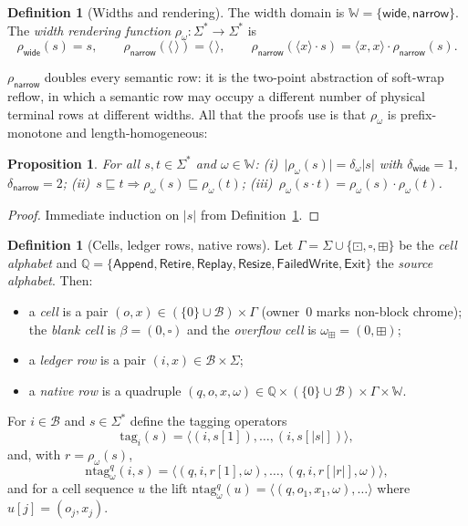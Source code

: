 \documentclass[11pt]{article}
\newcommand{\seq}[1]{\langle #1\rangle}
\newcommand{\emptyseq}{\seq{\,}}
\newcommand{\len}[1]{\lvert #1\rvert}
\newcommand{\pre}{\sqsubseteq}                 %
\newcommand{\cat}{\mathbin{\cdot}}             %
\newcommand{\Blocks}{\mathcal{B}}
\newcommand{\Wd}{\mathbb{W}}
\newcommand{\Src}{\mathbb{Q}}
\newcommand{\PhRow}{\boxdot}                   %
\newcommand{\BlRow}{\square}                   %
\newcommand{\OvRow}{\boxplus}                  %
\newcommand{\Bcell}{\beta}                     %
\newcommand{\Ocell}{\omega_{\OvRow}}
\newcommand{\wide}{\mathsf{wide}}
\newcommand{\narrow}{\mathsf{narrow}}
\newcommand{\srcApp}{\mathsf{Append}}
\newcommand{\srcRet}{\mathsf{Retire}}
\newcommand{\srcRep}{\mathsf{Replay}}
\newcommand{\srcRsz}{\mathsf{Resize}}
\newcommand{\srcFail}{\mathsf{FailedWrite}}
\newcommand{\srcExit}{\mathsf{Exit}}
\newcommand{\ren}[1]{\rho_{#1}}
\newcommand{\tg}{\mathrm{tag}}
\newcommand{\ntg}{\mathrm{ntag}}
\newtheorem{proposition}[theorem]{Proposition}
\theoremstyle{definition}
\newtheorem{definition}[theorem]{Definition}
\theoremstyle{remark}
\begin{document}
\begin{definition}[Widths and rendering]\label{def:render}
The width domain is $\Wd=\{\wide,\narrow\}$. The \emph{width rendering
function} $\ren{\omega}:\Sigma^{*}\to\Sigma^{*}$ is
\[
  \ren{\wide}(s)=s,
  \qquad
  \ren{\narrow}(\emptyseq)=\emptyseq,
  \qquad
  \ren{\narrow}(\seq{x}\cat s)=\seq{x,x}\cat\ren{\narrow}(s).
\]
\end{definition}

$\ren{\narrow}$ doubles every semantic row: it is the two-point abstraction of
soft-wrap reflow, in which a semantic row may occupy a different number of
physical terminal rows at different widths. All that the proofs use is that
$\ren{\omega}$ is prefix-monotone and length-homogeneous:

\begin{proposition}\label{prop:render}
For all $s,t\in\Sigma^{*}$ and $\omega\in\Wd$:
(i)~$\len{\ren{\omega}(s)}=\delta_\omega\len{s}$ with $\delta_\wide=1$,
$\delta_\narrow=2$;
(ii)~$s\pre t \Rightarrow \ren{\omega}(s)\pre\ren{\omega}(t)$;
(iii)~$\ren{\omega}(s\cat t)=\ren{\omega}(s)\cat\ren{\omega}(t)$.
\end{proposition}
\begin{proof}
Immediate induction on $\len{s}$ from Definition~\ref{def:render}.
\end{proof}

\begin{definition}[Cells, ledger rows, native rows]\label{def:cells}
Let $\Gamma=\Sigma\cup\{\PhRow,\BlRow,\OvRow\}$ be the \emph{cell alphabet}
and $\Src=\{\srcApp,\srcRet,\srcRep,\srcRsz,\srcFail,\srcExit\}$ the
\emph{source alphabet}. Then:
\begin{itemize}
\item a \emph{cell} is a pair $(o,x)\in(\{0\}\cup\Blocks)\times\Gamma$
  (owner~$0$ marks non-block chrome); the \emph{blank cell} is
  $\Bcell=(0,\BlRow)$ and the \emph{overflow cell} is $\Ocell=(0,\OvRow)$;
\item a \emph{ledger row} is a pair $(i,x)\in\Blocks\times\Sigma$;
\item a \emph{native row} is a quadruple
  $(q,o,x,\omega)\in\Src\times(\{0\}\cup\Blocks)\times\Gamma\times\Wd$.
\end{itemize}
For $i\in\Blocks$ and $s\in\Sigma^{*}$ define the tagging operators
\[
  \tg_i(s) = \seq{(i,s[1]),\dots,(i,s[\len{s}])},
\]
and, with $r=\ren{\omega}(s)$,
\[
  \ntg^{q}_{\omega}(i,s)
    = \seq{(q,i,r[1],\omega),\dots,(q,i,r[\len{r}],\omega)},
\]
and for a cell sequence $u$ the lift
$\ntg^{q}_{\omega}(u)=\seq{(q,o_1,x_1,\omega),\dots}$ where $u[j]=(o_j,x_j)$.
\end{definition}
\end{document}
